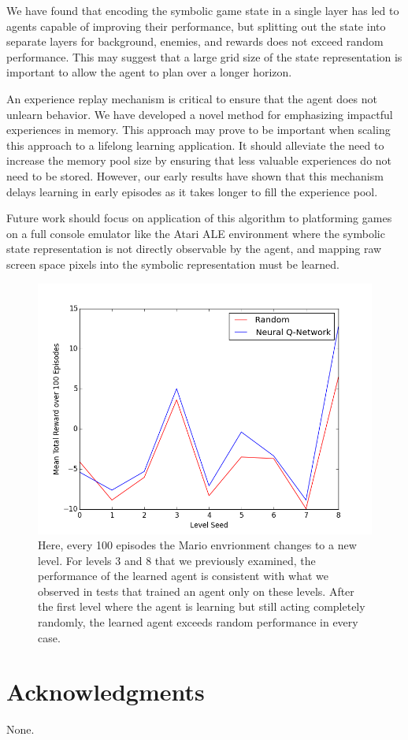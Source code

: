 \documentclass{article}
\begin{document}
We have found that encoding the symbolic game state in a single layer has led to agents capable of improving their performance, but splitting out the state into separate layers for background, enemies, and rewards does not exceed random performance. This may suggest that a large grid size of the state representation is important to allow the agent to plan over a longer horizon.
 
An experience replay mechanism is critical to ensure that the agent does not unlearn behavior. We have developed a novel method for emphasizing impactful experiences in memory. This approach may prove to be important when scaling this approach to a lifelong learning application. It should alleviate the need to increase the memory pool size by ensuring that less valuable experiences do not need to be stored. However, our early results have shown that this mechanism delays learning in early episodes as it takes longer to fill the experience pool.
 
Future work should focus on application of this algorithm to platforming games on a full console emulator like the Atari ALE environment where the symbolic state representation is not directly observable by the agent, and mapping raw screen space pixels into the symbolic representation must be learned.
 
 \begin{figure}
\begin{center}
\includegraphics[scale=0.42]{transfer_levels.png}
\caption{Here, every 100 episodes the Mario envrionment changes to a new level. For levels 3 and 8 that we previously examined, the performance of the learned agent is consistent with what we observed in tests that trained an agent only on these levels. After the first level where the agent is learning but still acting completely randomly, the learned agent exceeds random performance in every case.}
\end{center}
\end{figure}
 
\section*{Acknowledgments} 
 
None.



\end{document}
